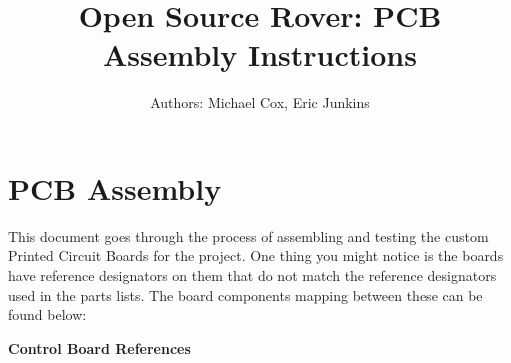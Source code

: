 \documentclass[12pt]{article}
\begin{document}
\newcommand\partimg{\includegraphics[width=2cm,height=1.0cm,keepaspectratio]}

\title{Open Source Rover: PCB Assembly Instructions}
\author{Authors: Michael Cox, Eric Junkins}

\makeatletter
\def\@maketitle{
\begin{center}
	\makebox[\textwidth][c]{ \texttt{[image: "img/Pictures/Assembly/assembly\_15".png]}}
	{\Huge \bfseries \sffamily \@title }\\[3ex]
	{\Large \sffamily \@author}\\[3ex]
	\texttt{[image: "img/JPL logo".png]}
\end{center}}
\makeatother

\maketitle



\newpage


\tableofcontents

\newpage

\section{PCB Assembly}
This document goes through the process of assembling and testing the custom Printed Circuit Boards for the project. One thing you might notice is the boards have reference designators on them that do not match the reference designators used in the parts lists. The board components mapping between these can be found below:

\bigskip 
\begin{frame}{}
  \centering \Huge
  \textbf{Control Board References}
\end{frame}
\end{document}
